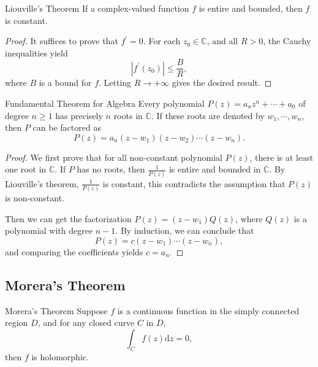 \begin{theorem}{Liouville's Theorem}{}
  If a complex-valued function $f$ is entire and bounded, then $f$ is constant.
\end{theorem}

\begin{proof}
  It suffices to prove that $f^{\prime} = 0$.
  For each $z_0 \in \mathbb{C}$, and all $R > 0$, the Cauchy inequalities yield
  \begin{equation}
    |f^{\prime}(z_0)| \leq \frac{B}{R},
  \end{equation}
  where $B$ is a bound for $f$. Letting $R \rightarrow +\infty$ gives the desired result.
\end{proof}

\begin{theorem}{Fundamental Theorem for Algebra}{}
  Every polynomial $P(z) = a_nz^n + \cdots + a_0$ of degree $n \geq 1$
  has precisely $n$ roots in $\mathbb{C}$.
  If these roots are denoted by $w_1,\cdots,w_n$, then $P$ can be factored as
  \begin{equation}
    P(z) = a_n(z-w_1)(z-w_2)\cdots (z-w_n).
  \end{equation}
\end{theorem}

\begin{proof}
  We first prove that for all non-constant polynomial $P(z)$,
  there is at least one root in $\mathbb{C}$.
  If $P$ has no roots, then $\frac{1}{P(z)}$ is entire and bounded in $\mathbb{C}$.
  By Liouville's theorem, $\frac{1}{P(z)}$ is constant,
  this contradicts the assumption that $P(z)$ is non-constant.

  Then we can get the factorization $P(z) = (z-w_1)Q(z)$,
  where $Q(z)$ is a polynomial with degree $n-1$.
  By induction, we can conclude that
  \begin{equation}
    P(z) = c(z-w_1)\cdots (z-w_n),
  \end{equation}
  and comparing the coefficients yields $c = a_n$.
\end{proof}


\subsection{Morera's Theorem}

\begin{theorem}{Morera's Theorem}{}
  Suppose $f$ is a continuous function in the simply connected region $D$,
  and for any closed curve $C$ in $D$,
  \begin{equation}
    \int_C f(z)\mathrm{d} z = 0,
  \end{equation}
  then $f$ is holomorphic.
\end{theorem}


